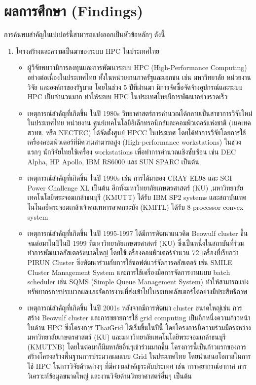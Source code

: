 \documentclass[a4paper,12pt]{extarticle}
\begin{document}
\section{ผลการศึกษา (Findings)}
การค้นพบสำคัญในเปเปอร์นี้สามารถแบ่งออกเป็นหัวข้อหลักๆ ดังนี้
\begin{enumerate}
	\item โครงสร้างและความเป็นมาของระบบ HPC ในประเทศไทย

	\begin{itemize}
		\item ผู้วิจัยพบว่ามีการลงทุนและการพัฒนาระบบ HPC (High-Performance Computing) อย่างต่อเนื่องในประเทศไทย ทั้งในหน่วยงานภาครัฐและเอกชน เช่น มหาวิทยาลัย หน่วยงานวิจัย และองค์กรของรัฐบาล โดยในช่วง 5 ปีที่ผ่านมา มีการจัดซื้อจัดจ้างอุปกรณ์และระบบ HPC เป็นจำนวนมาก ทำให้ระบบ HPC ในประเทศไทยมีการพัฒนาอย่างรวดเร็ว
		\item เหตุการณ์สำคัญที่เกิดขึ้น ในปี 1980s วิทยาศาสตร์การคำนวณได้กลายเป็นสาขาการวิจัยใหม่ในประเทศไทย หน่วยงาน ศูนย์เทคโนโลยีอิเล็กทรอนิกส์และคอมพิวเตอร์แห่งชาติ (เนคเทค สวทช. หรือ NECTEC) ได้จัดตั้งศูนย์ HPCC ในประเทศ โดยได้ทำการวิจัยโดยการใช้เครื่องคอมพิวเตอร์ที่มีความสามารถสูง (High-performance workstations) ในช่วงแรกๆ นักวิจัยไทยใช้เครื่อง workstations เพื่อทำการคำนวณเชิงซับซ้อน เช่น DEC Alpha, HP Apollo, IBM RS6000 และ SUN SPARC เป็นต้น
		\item เหตุการณ์สำคัญที่เกิดขึ้น ในปี 1990s เช่น การได้มาของ CRAY EL98 และ SGI Power Challenge XL เป็นต้น อีกทั้งมหาวิทยาลัยเกษตรศาสตร์ (KU) ,มหาวิทยาลัยเทคโนโลยีพระจอมเกล้าธนบุรี (KMUTT) ได้รับ IBM SP2 systems และสถาบันเทคโนโนลยีพระจอมเกล้าเจ้าคุณทหารลาดกระบัง (KMITL) ได้รับ 8-processor convex system
		\item เหตุการณ์สำคัญที่เกิดขึ้น ในปี 1995-1997 ได้มีการพัฒนาแนวคิด Beowulf cluster ขึ้น จนต่อมาในปีในปี 1999 ที่มหาวิทยาลัยเกษตรศาสตร์ (KU) ซึ่งเป็นหนึ่งในสถาบันที่ร่วมทำการพัฒนาคลัสเตอร์ขนาดใหญ่ โดยใช้เครื่องคอมพิวเตอร์จำนวน 72 เครื่องที่เรียกว่า PIRUN Cluster ซึ่งพัฒนาร่วมกับการใช้ซอฟต์แวร์จัดการคลัสเตอร์ เช่น SMILE Cluster Management System และการใช้เครื่องมือการจัดการงานแบบ batch scheduler เช่น SQMS (Simple Queue Management System) ทำให้สามารถแบ่งทรัพยากรการประมวลผลและจัดการงานที่ส่งเข้าไปในระบบคลัสเตอร์ได้อย่างมีประสิทธิภาพ
		\item เหตุการณ์สำคัญที่เกิดขึ้น ในปี 2001s หลังจากมีการพัฒนา cluster ขนาดใหญ่เช่น การสร้าง Beowulf cluster และการขยายการใช้ grid computing เป็นอีกหนึ่งความก้าวหน้าในด้าน HPC ซึ่งโครงการ ThaiGrid ได้เริ่มขึ้นในปีนี้ โดยโครงการนี้ความร่วมมือระหว่างมหาวิทยาลัยเกษตรศาสตร์ (KU) และมหาวิทยาลัยเทคโนโลยีพระจอมเกล้าธนบุรี (KMUTNB) โดยในต่อมาก็มีมหาลัยอื่นๆเข้าร่วมมากขึ้น โครงการนี้เป็นก้าวแรกของการสร้างโครงสร้างพื้นฐานการประมวลผลแบบ Grid ในประเทศไทย โดยนำเสนอโอกาสในการใช้ HPC ในการวิจัยด้านต่างๆ ที่มีความสำคัญระดับประเทศ เช่น การพยากรณ์อากาศ การวิเคราะห์ข้อมูลขนาดใหญ่ และงานวิจัยด้านวิทยาศาสตร์อื่นๆ เป็นต้น

\end{itemize}
\end{enumerate}
\end{document}

